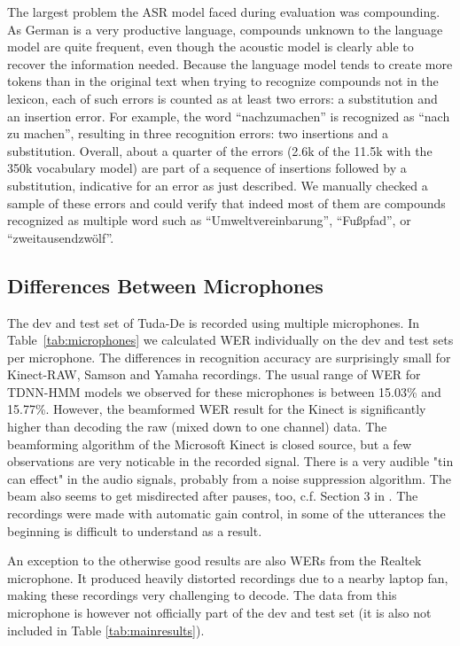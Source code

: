 \documentclass[a4paper]{article}
\begin{document}
The largest problem the ASR model faced during evaluation was
compounding.  As German is a very productive language, compounds
unknown to the language model are quite frequent, even though the
acoustic model is clearly able to recover the information needed.
Because the language model tends to create more tokens than in the
original text when trying to recognize compounds not in the lexicon,
each of such errors is counted as at least two errors:
a substitution and an insertion error.  For example, the word
``nachzumachen'' is recognized as ``nach zu machen'', resulting in
three recognition errors: two insertions and a substitution.
Overall, about a quarter of the errors (2.6k of the 11.5k with the 350k vocabulary model) are part of a sequence of insertions
followed by a substitution, indicative for an error as just described.
We manually checked a sample of these errors and could verify that
indeed most of them are compounds recognized as multiple word such as
``Umweltvereinbarung'', ``Fußpfad'', or ``zweitausendzwölf''.






\subsection{Differences Between Microphones}
\label{sec:diff-betw-micr}

The dev and test set of Tuda-De is recorded using multiple microphones. In Table~\ref{tab:microphones} we calculated WER individually on the dev and test sets per microphone.
The differences in recognition accuracy are surprisingly small for Kinect-RAW, Samson and Yamaha recordings. The usual range of WER for TDNN-HMM models we observed for these microphones is between 15.03\% and 15.77\%. However, the beamformed WER result for the Kinect is significantly higher than decoding the raw (mixed down to one channel) data. The beamforming algorithm of the Microsoft Kinect is closed source, but a few observations are very noticable in the recorded signal. There is a very audible "tin can effect" in the audio signals, probably from a noise suppression algorithm. The beam also seems to get misdirected after pauses, too, c.f. Section 3 in \cite{schnelle2014open}. The recordings were made with automatic gain control, in some of the utterances the beginning is difficult to understand as a result.

An exception to the otherwise good results are also WERs from the Realtek microphone. It produced heavily distorted recordings due to a nearby laptop fan, making these recordings very challenging to decode. The data from this microphone is however not officially part of the dev and test set (it is also not included in Table \ref{tab:mainresults}).
\end{document}
